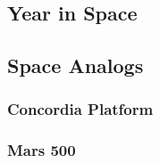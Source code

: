 \subsection{Year in Space}
\subsection{Space Analogs}
\subsubsection{Concordia Platform}
\subsubsection{Mars 500}